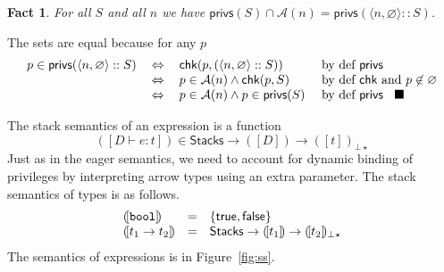 \documentclass[submission,copyright,creativecommons]{eptcs}
\newcommand{\blackslug}{\rule{7pt}{7pt}}
\newcommand{\BOOL}{\mbox{\texttt{bool}}}
\newcommand{\A}{\mathcal{A}}
\newcommand{\intersect}{\cap}
\newcommand{\proves}{\vdash}
\newcommand{\Empty}{\varnothing}
\newcommand{\tuple}[1]{\langle #1 \rangle}
\renewcommand{\check}{\textsf{chk}}
\newcommand{\privs}{\textsf{privs}}
\newcommand{\stacks}{\textsf{Stacks}}
\newcommand{\D}{D} \newcommand{\ty}{t} \renewcommand{\th}{\theta}
\newcommand{\n}{n} \newcommand{\p}{p} \newcommand{\Ps}{\Pi} \newcommand{\h}{h}
\newcommand{\meanss}[1]{(\![ {#1}]\!)}
\renewcommand{\iff}{\mathbin{\:\Leftrightarrow\:}}
\newtheorem{factx}[theorem]{Fact}
\newenvironment{xproof}{\begin{trivlist}\item[\hskip\labelsep{\bf  
Proof:}]}{\end{trivlist}}
\begin{document}
\begin{factx}
\label{fac:emp}
For all $S$ and all $n$ we have
$\privs(S)\intersect\A(\n)=\privs(\tuple{\n,\Empty}::S)$.
\end{factx}
\begin{xproof}
The sets are equal because for any $p$
\[\begin{array}{lcll}
\p\in\privs(\tuple{\n,\Empty}::S) 
&\iff& \check(\p,(\tuple{\n,\Empty}::S)) &\mbox{ by def $\privs$} \\
&\iff& \p\in\A(\n) \land \check(\p,S) 
  &\mbox{ by def $\check$ and $p\not\in\Empty$} \\
&\iff& \p\in\A(\n) \land \p\in\privs(S)&\mbox{ by def $\privs$ \; \blackslug} 
\end{array} \]
\end{xproof}
The stack semantics of an expression is a function
\[ \meanss{\D\proves e:\ty}\in \stacks
\to\meanss{\D}\to\meanss{\ty}_{\bot\star} \]
Just as in the eager semantics, we need to account for dynamic binding
of privileges by interpreting arrow types using an extra parameter.
The stack semantics of types is as follows.
\[
\begin{array}{lcl}
\meanss{\BOOL} &=& \{ \mathsf{true},  \mathsf{false} \} 
\\
\meanss{\ty_1\to\ty_2} &=& \stacks\to\meanss{\ty_1}\to\meanss{\ty_2}_{\bot\star}
\end{array}
\]
The semantics of expressions is in Figure~\ref{fig:ss}.
\end{document}
